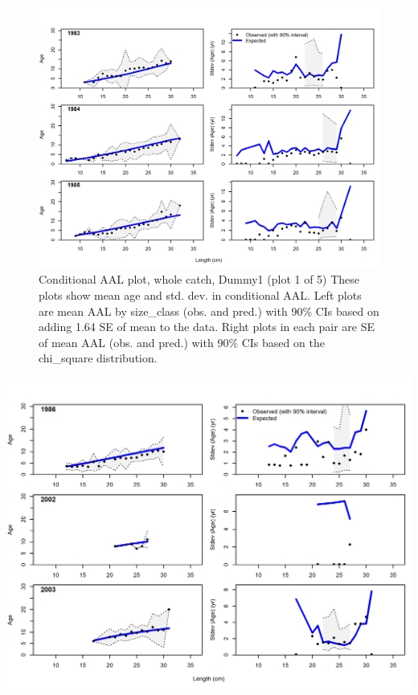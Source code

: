 \documentclass[12pt,]{article}
\begin{document}
\begin{figure}
\centering
\includegraphics{./r4ss/plots_mod1/comp_condAALfit_Andre_plotsflt12mkt0_page1.png}
\caption{Conditional AAL plot, whole catch, Dummy1 (plot 1 of 5) These
plots show mean age and std. dev. in conditional AAL. Left plots are
mean AAL by size\_class (obs. and pred.) with 90\% CIs based on adding
1.64 SE of mean to the data. Right plots in each pair are SE of mean AAL
(obs. and pred.) with 90\% CIs based on the chi\_square distribution.
\label{fig:mod1_17_comp_condAALfit_Andre_plotsflt12mkt0_page1}}
\end{figure}

\includegraphics{./r4ss/plots_mod1/comp_condAALfit_Andre_plotsflt12mkt0_page2.png}
\end{document}
